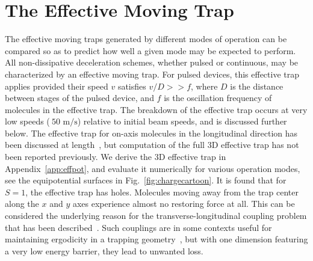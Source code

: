 \documentclass[%
 reprint,
 amsmath,amssymb,
 aps,
prl,
]{revtex4-1}
\begin{document}
\section{The Effective Moving Trap}
The effective moving traps generated by different modes of operation can be compared so as to predict how well a given mode may be expected to perform.
All non-dissipative deceleration schemes, whether pulsed or continuous, may be characterized by an effective moving trap. 
For pulsed devices, this effective trap applies provided their speed $v$ satisfies $v/D >> f$, where $D$ is the distance between stages of the pulsed device, and $f$ is the oscillation frequency of molecules in the effective trap. The breakdown of the effective trap occurs at very low speeds ($~50\text{ m/s}$) relative to initial beam speeds, and is discussed further below.
The effective trap for on-axis molecules in the longitudinal direction has been discussed at length~\cite{Bethlem2000,Hudson2004}, but computation of the full 3D effective trap has not been reported previously.
We derive the 3D effective trap in Appendix~\ref{app:effpot}, and evaluate it numerically for various operation modes, see the equipotential surfaces in Fig.~\ref{fig:chargecartoon}.
It is found that for $S=1$, the effective trap has holes. Molecules moving away from the trap center along the $x$ and $y$ axes experience almost no restoring force at all. 
This can be considered the underlying reason for the transverse-longitudinal coupling problem that has been described~\cite{VanDeMeerakker2006}. 
Such couplings are in some contexts useful for maintaining ergodicity in a trapping geometry~\cite{Surkov1996}, but with one dimension featuring a very low energy barrier, they lead to unwanted loss.
\end{document}

